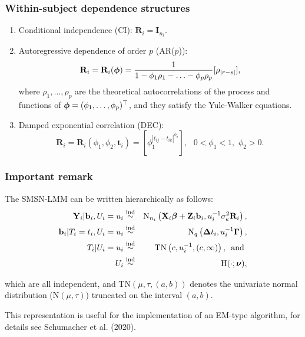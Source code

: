 \begin{frame}\frametitle{Within-subject dependence structures}
\begin{enumerate}
    \item Conditional independence (CI): $\textbf{R}_i = \mathbf{I}_{n_i}$.
    \item Autoregressive dependence of order $p$ (AR($p$)): \begin{equation*}
\mathbf{R}_{i}=\mathbf{R}_{i}(\mbox{${ \bm \phi}$})=\frac{1}{1-\phi_1\rho_1-\ldots -\phi_p\rho_p}[\rho_{|r-s|}],
\end{equation*}
where $\rho_1,\hdots,\rho_p$ are the theoretical autocorrelations of the process and functions of $\mbox{${ \bm \phi}$} = (\phi_1,\ldots,\phi_p)^\top$, and they satisfy the Yule-Walker equations.
\item Damped exponential correlation (DEC):
\begin{equation*}
    \textbf{R}_i = \textbf{R}_i(\phi_1,\phi_2,\textbf{t}_i) = \left[ \phi_1^{|t_{ij}-t_{ik}|^{\phi_2}}\right], \,\,\,\, 0<\phi_1<1,\,\, \phi_2>0.
\end{equation*}
\end{enumerate}
\end{frame}
\begin{frame}\frametitle{Important remark}
The SMSN-LMM can be written hierarchically as follows:
\vspace{-.2cm}\begin{eqnarray*}
    \mathbf{Y}_i|\textbf{b}_i,U_i=u_i &\stackrel {{\rm ind}}{\sim}& \textrm{N}_{n_i}\left(\textbf{X}_i\mbox{${\bm \beta}$}+\textbf{Z}_i\textbf{b}_i,
    u_i^{-1}\sigma_e^2\textbf{R}_i\right),\\
    \textbf{b}_i|T_i=t_i,U_i=u_i &\stackrel {{\rm ind}}{\sim}& \textrm{N}_{q}\left(\mbox{${ \bm \Delta}$} t_i,
    u_i^{-1}\mbox{${ \bm \Gamma}$}\right),\\
    T_i|U_i=u_i &\stackrel {{\rm ind}}{\sim}& \textrm{TN}\left(c,u_i^{-1}, (c,\infty)\right), \,\textrm{ and }\\
    U_i &\stackrel {{\rm ind}}{\sim}&  \textrm{H}(\cdot;\mbox{${ \bm \nu}$}), 
    \end{eqnarray*}

\vspace{-.2cm}which are all independent, and TN$(\mu,\tau,(a,b))$ denotes the univariate normal distribution (N$(\mu,\tau)$) truncated on the interval $(a,b)$.

This representation is useful for the implementation of an EM-type algorithm, for details see Schumacher et al. (2020).
\end{frame}

